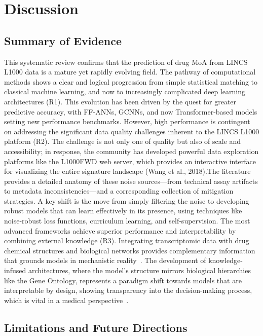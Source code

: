 \documentclass[twocolumn,12pt,a4paper]{article}
\begin{document}
\section{Discussion}
\subsection{Summary of Evidence}

    This systematic review confirms that the prediction of drug MoA from LINCS L1000 data is a mature yet rapidly evolving field. The pathway of computational methods shows a clear and logical progression from simple statistical matching to classical machine learning, and now to increasingly complicated deep learning architectures (R1). This evolution has been driven by the quest for greater predictive accuracy, with FF-ANNs, GCNNs, and now Transformer-based models setting new performance benchmarks\cite{mcdermott2019deep}.
    However, high performance is contingent on addressing the significant data quality challenges inherent to the LINCS L1000 platform (R2). The challenge is not only one of quality but also of scale and accessibility; in response, the community has developed powerful data exploration platforms like the L1000FWD web server, which provides an interactive interface for visualizing the entire signature landscape (Wang et al., 2018)\cite{wang2018l1000fwd}.The literature provides a detailed anatomy of these noise sources—from technical assay artifacts to metadata inconsistencies—and a corresponding collection of mitigation strategies\cite{qiu2020bayesian}. A key shift is the move from simply filtering the noise to developing robust models that can learn effectively in its presence, using techniques like noise-robust loss functions, curriculum learning, and self-supervision.
    The most advanced frameworks achieve superior performance and interpretability by combining external knowledge (R3). Integrating transcriptomic data with drug chemical structures and biological networks provides complementary information that grounds models in mechanistic reality~\cite{wang2016drug}. The development of knowledge-infused architectures, where the model's structure mirrors biological hierarchies like the Gene Ontology, represents a paradigm shift towards models that are interpretable by design, showing transparency into the decision-making process, which is vital in a medical perspective~\cite{samal2022opportunities}.

\subsection{Limitations and Future Directions}
\end{document}
